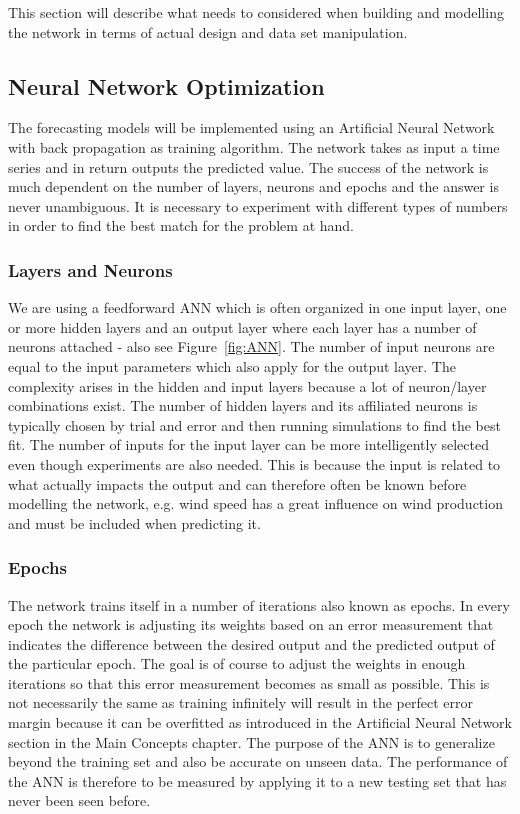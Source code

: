 This section will describe what needs to considered when building and modelling the network in terms of actual design and data set manipulation.

\subsection{Neural Network Optimization}
The forecasting models will be implemented using an Artificial Neural Network with back propagation as training algorithm. The network takes as input a time series and in return outputs the predicted value. The success of the network is much dependent on the number of layers, neurons and epochs and the answer is never unambiguous. It is necessary to experiment with different types of numbers in order to find the best match for the problem at hand.

\subsubsection{Layers and Neurons}
We are using a feedforward ANN which is often organized in one input layer, one or more hidden layers and an output layer where each layer has a number of neurons attached\cite{1} - also see Figure~\ref{fig:ANN}. The number of input neurons are equal to the input parameters which also apply for the output layer. 
The complexity arises in the hidden and input layers because a lot of neuron/layer combinations exist. The number of hidden layers and its affiliated neurons is typically chosen by trial and error and then running simulations to find the best fit\cite{1}. The number of inputs for the input layer can be more intelligently selected even though experiments are also needed. This is because the input is related to what actually impacts the output and can therefore often be known before modelling the network, e.g. wind speed has a great influence on wind production and must be included when predicting it.

\subsubsection{Epochs}
The network trains itself in a number of iterations also known as epochs. In every epoch the network is adjusting its weights based on an error measurement that indicates the difference between the desired output and the predicted output of the particular epoch\cite{1}. The goal is of course to adjust the weights in enough iterations so that this error measurement becomes as small as possible. This is not necessarily the same as training infinitely will result in the perfect error margin because it can be overfitted as introduced in the Artificial Neural Network section in the Main Concepts chapter. The purpose of the ANN is to generalize beyond the training set and also be accurate on unseen data\cite{1}. The performance of the ANN is therefore to be measured by applying it to a new testing set that has never been seen before.

